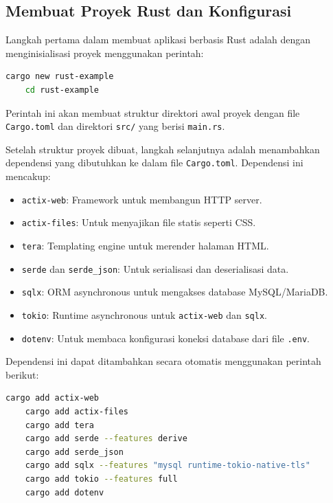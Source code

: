 \subsection{Membuat Proyek Rust dan Konfigurasi}

Langkah pertama dalam membuat aplikasi berbasis Rust adalah dengan menginisialisasi proyek menggunakan perintah:

\begin{lstlisting}[language=bash, basicstyle=\footnotesize\ttfamily, caption={Membuat proyek baru Rust}, label={lst:cargo-new}]
	cargo new rust-example
	cd rust-example
\end{lstlisting}

Perintah ini akan membuat struktur direktori awal proyek dengan file \texttt{Cargo.toml} dan direktori \texttt{src/} yang berisi \texttt{main.rs}.

Setelah struktur proyek dibuat, langkah selanjutnya adalah menambahkan dependensi yang dibutuhkan ke dalam file \texttt{Cargo.toml}. Dependensi ini mencakup:

\begin{itemize}
	\item \texttt{actix-web}: Framework untuk membangun HTTP server.
	\item \texttt{actix-files}: Untuk menyajikan file statis seperti CSS.
	\item \texttt{tera}: Templating engine untuk merender halaman HTML.
	\item \texttt{serde} dan \texttt{serde\_json}: Untuk serialisasi dan deserialisasi data.
	\item \texttt{sqlx}: ORM asynchronous untuk mengakses database MySQL/MariaDB.
	\item \texttt{tokio}: Runtime asynchronous untuk \texttt{actix-web} dan \texttt{sqlx}.
	\item \texttt{dotenv}: Untuk membaca konfigurasi koneksi database dari file \texttt{.env}.
\end{itemize}

Dependensi ini dapat ditambahkan secara otomatis menggunakan perintah berikut:

\begin{lstlisting}[language=bash, basicstyle=\footnotesize\ttfamily, caption={Menambahkan dependensi menggunakan cargo add}, label={lst:cargo-add}]
	cargo add actix-web
	cargo add actix-files
	cargo add tera
	cargo add serde --features derive
	cargo add serde_json
	cargo add sqlx --features "mysql runtime-tokio-native-tls"
	cargo add tokio --features full
	cargo add dotenv
\end{lstlisting}

